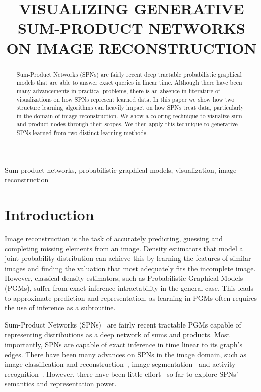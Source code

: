 \documentclass{article}
\title{VISUALIZING GENERATIVE SUM-PRODUCT NETWORKS ON IMAGE RECONSTRUCTION}
\begin{document}
%
\maketitle
%
\begin{abstract}
  Sum-Product Networks (SPNs) are fairly recent deep tractable probabilistic graphical models that
  are able to answer exact queries in linear time. Although there have been many advancements in
  practical problems, there is an absence in literature of visualizations on how SPNs represent
  learned data. In this paper we show how two structure learning algorithms can heavily impact on
  how SPNs treat data, particularly in the domain of image reconstruction. We show a coloring
  technique to visualize sum and product nodes through their scopes. We then apply this technique
  to generative SPNs learned from two distinct learning methods.
\end{abstract}
%
\begin{keywords}
Sum-product networks, probabilistic graphical models, visualization, image reconstruction
\end{keywords}
%
\section{Introduction}
\label{sec:intro}

Image reconstruction is the task of accurately predicting, guessing and completing missing elements
from an image. Density estimators that model a joint probability distribution can achieve this by
learning the features of similar images and finding the valuation that most adequately fits the
incomplete image. However, classical density estimators, such as Probabilistic Graphical Models
(PGMs), suffer from exact inference intractability in the general case. This leads to approximate
prediction and representation, as learning in PGMs often requires the use of inference as a
subroutine.

Sum-Product Networks (SPNs)~\cite{poon11} are fairly recent tractable PGMs capable of representing
distributions as a deep network of sums and products. Most importantly, SPNs are capable of exact
inference in time linear to its graph's edges. There have been many advances on SPNs in the image
domain, such as image classification and reconstruction~\cite{gens13,dennis12,gens12}, image
segmentation~\cite{yuan16} and activity recognition~\cite{amer12,amer16,wang18}. However, there
have been little effort~\cite{vergari16} so far to explore SPNs' semantics and representation
power.
\end{document}
